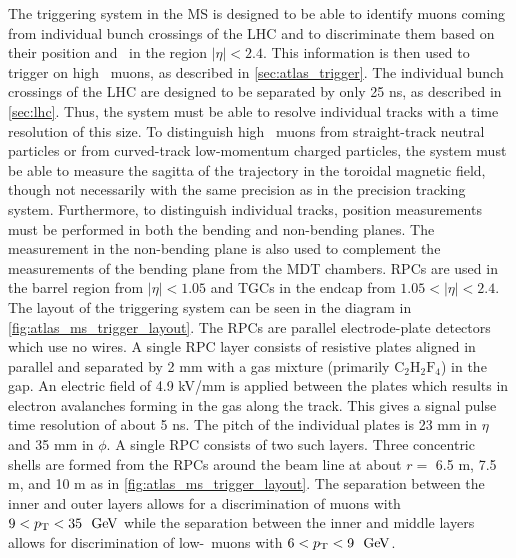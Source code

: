 The triggering system in the MS is designed to be able
to identify muons coming from individual bunch crossings of the LHC
and to discriminate them based on their position and \pt~in the region
$|\eta|<2.4$. This information
is then used to trigger on high \pt~muons, as 
described in \sec\ref{sec:atlas_trigger}.
The individual bunch crossings of the LHC are designed to 
be separated by only 25 ns, as described in \sec\ref{sec:lhc}.
Thus, the system must be able to resolve individual tracks 
with a time resolution of this size.
To distinguish high \pt~muons from straight-track neutral particles 
or from curved-track low-momentum charged particles, the 
system must be able to measure the sagitta of the 
trajectory in the toroidal magnetic field, though not necessarily
with the same precision as in the precision tracking system.
Furthermore, to distinguish individual tracks, position measurements
must be performed in both the bending and non-bending planes.
The measurement in the non-bending plane is also used to complement
the measurements of the bending plane from the MDT chambers.
RPCs are used in the barrel region
from $|\eta|<1.05$ and TGCs in the endcap from $1.05 < |\eta|<2.4$.
The layout of the triggering system can be seen in the diagram
in \fig\ref{fig:atlas_ms_trigger_layout}. 
The RPCs are parallel electrode-plate detectors which use no wires.
A single RPC layer consists of 
resistive plates aligned in parallel and separated by 2 mm 
with a gas mixture (primarily $\textrm{C}_2\textrm{H}_2\textrm{F}_4$)
in the gap. An electric field of 4.9 kV/mm is applied between 
the plates which results in electron avalanches forming in the gas
along the track.
This gives a signal pulse time resolution of about 5 ns.
The pitch of the individual plates is 23 mm in $\eta$ and 35 mm in $\phi$.
A single RPC consists of two such layers.  Three concentric shells 
are formed from the RPCs around the beam line 
at about $r = $ 6.5 m, 7.5 m, and 10 m
as in \fig\ref{fig:atlas_ms_trigger_layout}.
The separation between the inner and outer layers 
allows for a discrimination of muons with $9 < \pt < 35~\GeV$
while the separation between the inner and middle layers allows for 
discrimination of low-\pt~muons with $6 < \pt < 9~\GeV$.


